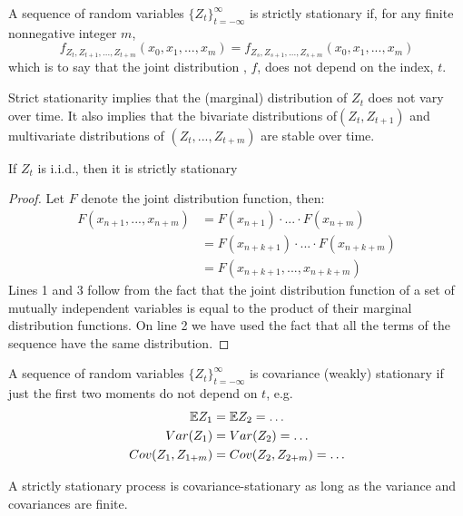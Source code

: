 \documentclass[DIV=14,titlepage=false]{scrreprt}
\begin{document}
\begin{definition}
    A sequence of random variables $\{Z_t\}^{\infty}_{t=-\infty}$ is strictly stationary if, for any finite nonnegative integer $m$,
    \[
        f_{Z_t, Z_{t+1}, ..., Z_{t+m}}(x_0, x_1, ..., x_m)=  f_{Z_s, Z_{s+1}, ..., Z_{s+m}}(x_0, x_1, ..., x_m)
    \]
    which is to say that the joint distribution , $f$, does not depend on the index, $t$.
\end{definition}
Strict stationarity implies that the (marginal) distribution of $Z_t$ does not vary over time. It also implies that the bivariate distributions of$ (Z_t, Z_{t+1})$ and multivariate distributions of $ (Z_t, ..., Z_{t+m})$ are stable over time.

\begin{theorem}
    If $Z_t$ is i.i.d., then it is strictly stationary
\end{theorem}
\begin{proof}
    Let $F$ denote the joint distribution function, then:
    \begin{align*}
        F(x_{n+1}, ..., x_{n+m}) &= F(x_{n+1})\cdot ... \cdot F(x_{n+m})\\
        &= F(x_{n+k+1})\cdot ... \cdot F(x_{n+k+m})\\
        &= F(x_{n+k+1},...,x_{n+k+m})
    \end{align*}
    Lines 1 and 3 follow from the fact that the joint distribution function of a set of mutually independent variables is equal to the product of their marginal distribution functions. On line 2 we have used the fact that all the terms of the sequence have the same distribution. 
\end{proof}


\begin{definition}
    A sequence of random variables $\{Z_t\}^{\infty}_{t=-\infty}$ is covariance (weakly) stationary if just the first two moments do not depend on $t$, e.g.
    \begin{align*}
        \mathbb{E} Z_1 &= \mathbb{E} Z_2 = \dots\\
        Var(Z_1)&=Var(Z_2)= \dots\\
        Cov(Z_1, Z_{1+m}) &= Cov(Z_2, Z_{2+m}) = \dots
    \end{align*}
\end{definition}
A strictly stationary process is covariance-stationary as long as the variance and covariances are finite.
\end{document}
